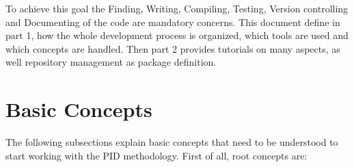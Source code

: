 \documentclass[12pt,a4paper]{article}
\begin{document}
To achieve this goal the Finding, Writing, Compiling, Testing, Version controlling and Documenting of the code are mandatory concerns. This document define in part 1, how the whole development process is organized, which tools are used and which concepts are handled. Then part 2 provides tutorials on many aspects, as well repository management as package definition.

\pagebreak

\part{Basic Concepts}

The following subsections explain basic concepts that need to be understood to start working with the PID methodology. First of all, root concepts are:
\end{document}
